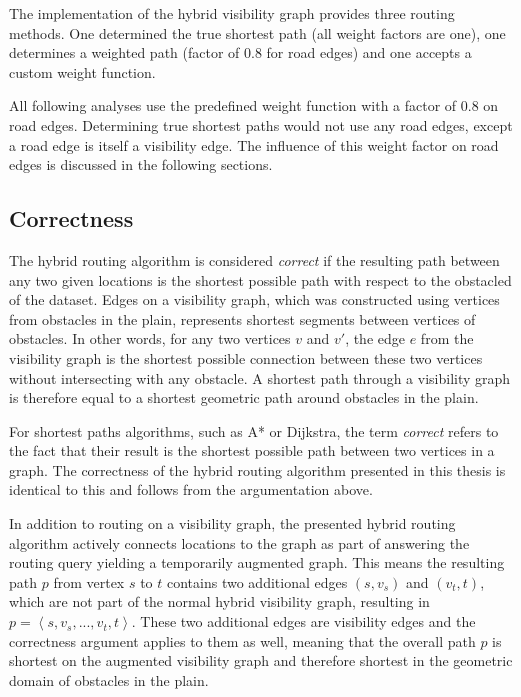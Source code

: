		The implementation of the hybrid visibility graph provides three routing methods.
		One determined the true shortest path (all weight factors are one), one determines a weighted path (factor of 0.8 for road edges) and one accepts a custom weight function.
		
		All following analyses use the predefined weight function with a factor of 0.8 on road edges.
		Determining true shortest paths would not use any road edges, except a road edge is itself a visibility edge.
		The influence of this weight factor on road edges is discussed in the following sections.

	\subsection{Correctness}
	\label{subsec:correctness}
	
		The hybrid routing algorithm is considered \emph{correct} if the resulting path between any two given locations is the shortest possible path with respect to the obstacled of the dataset.
		Edges on a visibility graph, which was constructed using vertices from obstacles in the plain, represents shortest segments between vertices of obstacles.
		In other words, for any two vertices $v$ and $v'$, the edge $e$ from the visibility graph is the shortest possible connection between these two vertices without intersecting with any obstacle.
		A shortest path through a visibility graph is therefore equal to a shortest geometric path around obstacles in the plain.
		
		For shortest paths algorithms, such as A* or Dijkstra, the term \emph{correct} refers to the fact that their result is the shortest possible path between two vertices in a graph.
		The correctness of the hybrid routing algorithm presented in this thesis is identical to this and follows from the argumentation above.
		
		In addition to routing on a visibility graph, the presented hybrid routing algorithm actively connects locations to the graph as part of answering the routing query yielding a temporarily augmented graph.
		This means the resulting path $p$ from vertex $s$ to $t$ contains two additional edges $(s, v_s)$ and $(v_t, t)$, which are not part of the normal hybrid visibility graph, resulting in $p=\left\langle s, v_s, ..., v_t, t \right\rangle$.
		These two additional edges are visibility edges and the correctness argument applies to them as well, meaning that the overall path $p$ is shortest on the augmented visibility graph and therefore shortest in the geometric domain of obstacles in the plain.
		
